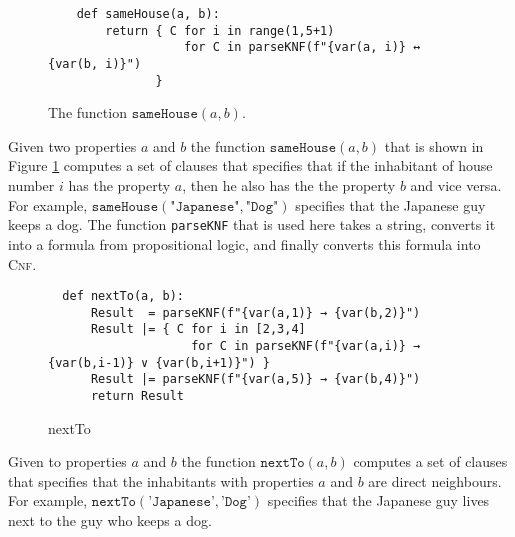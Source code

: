 \begin{figure}[!ht]
\centering
\begin{verbatim}
    def sameHouse(a, b):
        return { C for i in range(1,5+1)
                   for C in parseKNF(f"{var(a, i)} ↔ {var(b, i)}") 
               }
\end{verbatim}
\vspace*{-0.3cm}
\caption{The function $\texttt{sameHouse}(a, b)$.}
\label{fig:sameHouse}
\end{figure}

Given two properties $a$ and $b$ the function $\texttt{sameHouse}(a, b)$ that is
shown in Figure \ref{fig:sameHouse} computes
a set of clauses that specifies that if the inhabitant of house number $i$ has
the property $a$, then he also has the the property $b$ and vice versa.  For
example, $\texttt{sameHouse}(\texttt{"Japanese"}, \texttt{"Dog"})$ specifies
that the Japanese guy keeps a dog.  The function \texttt{parseKNF} that is used here takes a string, converts
it into a formula from propositional logic, and finally converts this formula into \textsc{Cnf}.


\begin{figure}[!ht]
\centering
\begin{verbatim}
  def nextTo(a, b):
      Result  = parseKNF(f"{var(a,1)} → {var(b,2)}")
      Result |= { C for i in [2,3,4]
                    for C in parseKNF(f"{var(a,i)} → {var(b,i-1)} ∨ {var(b,i+1)}") }
      Result |= parseKNF(f"{var(a,5)} → {var(b,4)}")
      return Result
\end{verbatim}
\vspace*{-0.3cm}
\caption{nextTo}
\label{fig:nextTo}
\end{figure}
Given to properties $a$ and $b$ the function $\texttt{nextTo}(a, b)$ computes a
set of clauses that specifies that the inhabitants with properties $a$ and $b$
are direct neighbours.  For example, $\texttt{nextTo}(\texttt{'Japanese'}, \texttt{'Dog'})$
specifies that the Japanese guy lives next to the guy who keeps a dog. 


